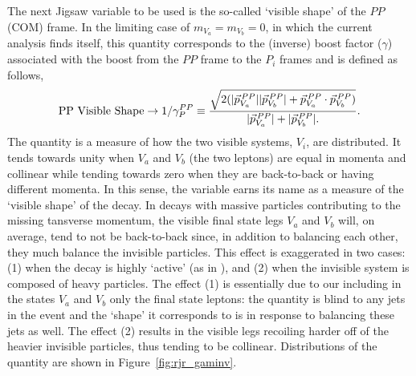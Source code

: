 The next Jigsaw variable to be used is the so-called `visible shape' of the $PP$ (COM) frame.
In the limiting case of $m_{V_a} = m_{V_b} = 0$, in which the current analysis finds itself,
this quantity corresponds to the (inverse) boost factor ($\gamma$) associated with the boost from the
$PP$ frame to the $P_i$ frames and is defined as follows,
\begin{align}
    \text{PP Visible Shape} \rightarrow 1/\gamma_P^{PP} \equiv \frac{
        \sqrt{
            2(|\vec{p}_{V_a}^{\,PP}| |\vec{p}_{V_b}^{\,PP}| + \vec{p}_{V_a}^{\,PP} \cdot \vec{p}_{V_b}^{\,PP})
        }
    }
    {
        |\vec{p}_{V_a}^{\,PP}| + |\vec{p}_{V_b}^{\,PP}|.
    }.
    \label{eq:rjr_gaminv}
\end{align}
The quantity \gaminv is a measure of how the two visible systems, $V_i$, are distributed.
It tends towards unity when $V_a$ and $V_b$ (the two leptons) are equal in momenta and collinear while tending
towards zero when they are back-to-back or having different momenta.
In this sense, the variable earns its name as a measure of the `visible shape' of the decay.
In decays with massive particles contributing to the missing tansverse momentum,
the visible final state legs $V_a$ and $V_b$ will, on average, tend to not be back-to-back since,
in addition to balancing each other, they much balance the invisible particles.
This effect is exaggerated in two cases: (1) when the decay is highly `active' (as in \ttbar),
and (2) when the invisible system is composed of heavy particles.
The effect (1) is essentially due to our including in the states $V_a$ and $V_b$ only the
final state leptons: the quantity \gaminv is blind to any jets in the event and the `shape' it
corresponds to is in response to balancing these jets as well.
The effect (2) results in the visible legs recoiling harder off of the heavier invisible particles,
thus tending to be collinear.
Distributions of the \gaminv quantity are shown in Figure~\ref{fig:rjr_gaminv}.

